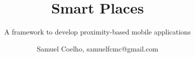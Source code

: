 \documentclass{./llncs2e/llncs}
\begin{document}
\title{Smart Places}

\subtitle{A framework to develop proximity-based mobile applications}
\author{Samuel Coelho, samuelfcmc@gmail.com}

\maketitle









\newpage
\appendix


%
%



\end{document}
